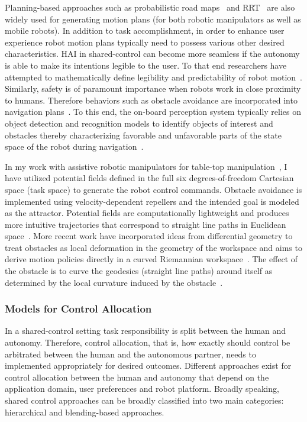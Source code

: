 \documentclass[12pt]{article}
\begin{document}
Planning-based approaches such as probabilistic road maps~\cite{kavraki1996analysis} and RRT~\cite{kuffner2000rrt} are also widely used for generating motion plans (for both robotic manipulators as well as mobile robots). In addition to task accomplishment, in order to enhance user experience robot motion plans typically need to possess various other desired characteristics. HAI in shared-control can become more seamless if the autonomy is able to make its intentions legible to the user. To that end researchers have attempted to mathematically define legibility and predictability of robot motion~\cite{dragan2013legibility}. Similarly, safety is of paramount importance when robots work in close proximity to humans. Therefore behaviors such as obstacle avoidance are incorporated into navigation plans~\cite{storms2014blending}. To this end, the on-board perception system typically relies on object detection and recognition models to identify objects of interest and obstacles thereby characterizing favorable and unfavorable parts of the state space of the robot during navigation~\cite{muller2006off}.

 In my work with assistive robotic manipulators for table-top manipulation~\cite{gopinath2017human}, I have utilized potential fields defined in the full six degrees-of-freedom Cartesian space (task space) to generate the robot control commands. Obstacle avoidance is implemented using velocity-dependent repellers and the intended goal is modeled as the attractor. Potential fields are computationally lightweight and produces more intuitive trajectories that correspond to straight line paths in Euclidean space~\cite{khatib1986real}. More recent work have incorporated ideas from differential geometry to treat obstacles as local deformation in the geometry of the workspace and aims to derive motion policies directly in a curved Riemannian workspace~\cite{ratliff2018riemannian}. The effect of the obstacle is to curve the geodesics (straight line paths) around itself as determined by the local curvature induced by the obstacle~\cite{mainprice2016warping}. 
\subsubsection{Models for Control Allocation}

In a shared-control setting task responsibility is split between the human and autonomy. Therefore, control allocation, that is, how exactly should control be arbitrated between the human and the autonomous partner, needs to implemented appropriately for desired outcomes. Different approaches exist for control allocation between the human and autonomy that depend on the application domain, user preferences and robot platform. 
Broadly speaking, shared control approaches can be broadly classified into two main categories: hierarchical and blending-based approaches.
\end{document}

